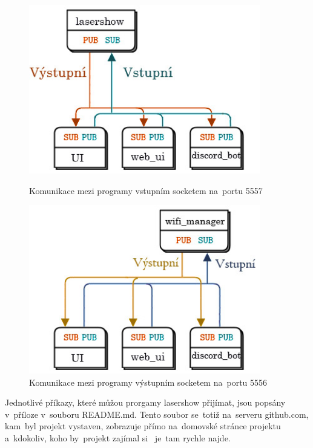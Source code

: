 \begin{figure}[htb]
  \centering
  \begin{minipage}{0.45\textwidth}
    \centering
    \includegraphics[width=0.9\textwidth]{img/comms_lasershow_scheme.jpg}
    \caption{\label{fig:lasershow_comms} Komunikace mezi programy vstupním socketem na~portu 5557}
  \end{minipage}\hfill
  \begin{minipage}{0.45\textwidth}
    \centering
    \includegraphics[width=0.9\textwidth]{img/comms_wifiman_scheme.jpg}
    \caption{\label{fig:wifiman_comms} Komunikace mezi programy výstupním socketem na~portu 5556}
  \end{minipage}
\end{figure}

Jednotlivé příkazy, které můžou prorgamy lasershow přijímat, jsou popsány  v~příloze  v~souboru README.md. Tento soubor se~totiž na~serveru github.com,  kam~byl projekt vystaven, zobrazuje přímo na~domovské stránce projektu  a~kdokoliv, koho by~projekt zajímal si ~je~tam rychle najde.
